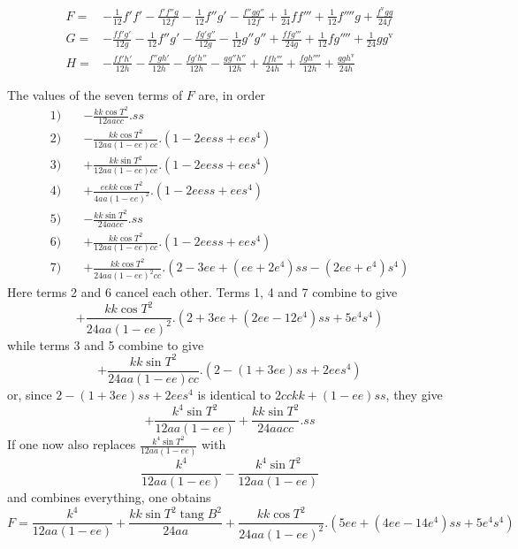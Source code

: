 %
\[
\begin{aligned}
F={}&-\tfrac1{12}f'f'-\frac{f'f''g}{12f}-\tfrac1{12}f''g'-\frac{f''gg''}{12f}+\tfrac1{24}ff'''+\tfrac1{12}f''''g+\frac{f^{\mathrm{v}}gg}{24f}\\
G={}&-\frac{ff'g'}{12g}-\tfrac1{12}f''g'-\frac{fg'g''}{12g}-\tfrac1{12}g''g''+\frac{ffg'''}{24g}+\tfrac1{12}fg''''+\tfrac1{24}gg^{\mathrm{v}}\\
H={}&-\frac{ff'h'}{12h}-\frac{f''gh'}{12h}-\frac{fg'h''}{12h}-\frac{gg''h''}{12h}+\frac{ffh'''}{24h}+\frac{fgh''''}{12h}+\frac{ggh^{\mathrm{v}}}{24h}
\end{aligned}
\]

The values of the seven terms of \(F\) are, in order
\[
\begin{aligned}
1)\quad&-\frac{kk\cos T^2}{12aacc}\mathord{.}ss\\
2)\quad&-\frac{kk\cos T^2}{12aa(1-ee)cc}\mathord{.}(1-2eess+ees^4)\\
3)\quad&+\frac{kk\sin T^2}{12aa(1-ee)cc}\mathord{.}(1-2eess+ees^4)\\
4)\quad&+\frac{eekk\cos T^2}{4aa(1-ee)^2}\mathord{.}(1-2eess+ees^4)\\
5)\quad&-\frac{kk\sin T^2}{24aacc}\mathord{.}ss\\
6)\quad&+\frac{kk\cos T^2}{12aa(1-ee)cc}\mathord{.}(1-2eess+ees^4)\\
7)\quad&+\frac{kk\cos T^2}{24aa(1-ee)^2cc}\mathord{.}(2-3ee+(ee+2e^4)ss-(2ee+e^4)s^4)
\end{aligned}
\]
Here terms 2 and 6 cancel each other. Terms 1, 4 and 7 combine to give
\[
+\frac{kk\cos T^2}{24aa(1-ee)^2}\mathord{.}(2+3ee+(2ee-12e^4)ss+5e^4s^4)
\]
while terms 3 and 5 combine to give
\[
+\frac{kk\sin T^2}{24aa(1-ee)cc}\mathord{.}(2-(1+3ee)ss+2ees^4)
\]
or, since \(2-(1+3ee)ss+2ees^4\) is identical to \(2cckk+(1-ee)ss\), they give
\[
+\frac{k^4\sin T^2}{12aa(1-ee)}+\frac{kk\sin T^2}{24aacc}\mathord{.}ss
\]
If one now also replaces \(\frac{k^4\sin T^2}{12aa(1-ee)}\) with
\[
\frac{k^4}{12aa(1-ee)}-\frac{k^4\sin T^2}{12aa(1-ee)}
\]
and combines everything, one obtains
\begingroup\fontsize{10}{12}\selectfont
\[
F=\frac{k^4}{12aa(1-ee)}+\frac{kk\sin T^2\operatorname{tang}B^2}{24aa}+\frac{kk\cos T^2}{24aa(1-ee)^2}\mathord{.}(5ee+(4ee-14e^4)ss+5e^4s^4)
\]
\endgroup
